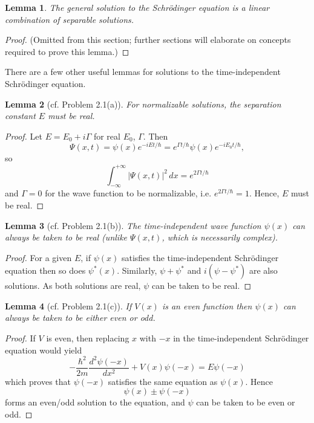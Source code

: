\documentclass{article}
\newtheorem*{lemma*}{Lemma}
\begin{document}
\begin{lemma*}
  The general solution to the Schr\"{o}dinger equation is a \emph{linear
  combination} of separable solutions.
\end{lemma*}
\begin{proof}
  (Omitted from this section; further sections will elaborate on concepts
  required to prove this lemma.)
\end{proof}

There are a few other useful lemmas for solutions to the time-independent
Schr\"{o}dinger equation.

\begin{lemma*}[cf. Problem 2.1(a)]
  For normalizable solutions, the separation constant $E$ must be real.
\end{lemma*}
\begin{proof}
  Let $E = E_0 + i\Gamma$ for real $E_0$, $\Gamma$. Then \[
    \Psi(x, t)
    = \psi(x)e^{-iEt/\hbar}
    = e^{\Gamma t/\hbar} \psi(x) e^{-iE_0t/\hbar},
  \] so \[
    \int_{-\infty}^{+\infty} |\Psi(x, t)|^2 \,dx = e^{2\Gamma t/\hbar}
  \] and $\Gamma = 0$ for the wave function to be normalizable, i.e.
  $e^{2\Gamma t/\hbar} = 1$. Hence, $E$ must be real.
\end{proof}

\begin{lemma*}[cf. Problem 2.1(b)]
  The time-independent wave function $\psi(x)$ can always be taken to be real
  (unlike $\Psi(x, t)$, which is necessarily complex).
\end{lemma*}
\begin{proof}
  For a given $E$, if $\psi(x)$ satisfies the time-independent Schr\"{o}dinger
  equation then so does $\psi^*(x)$. Similarly, $\psi + \psi^*$ and
  $i(\psi - \psi^*)$ are also solutions. As both solutions are real, $\psi$ can
  be taken to be real.
\end{proof}

\begin{lemma*}[cf. Problem 2.1(c)]
  If $V(x)$ is an even function then $\psi(x)$ can always be taken to be either
  even or odd.
\end{lemma*}
\begin{proof}
  If $V$ is even, then replacing $x$ with $-x$ in the time-independent
  Schr\"{o}dinger equation would yield \[
    -\frac{\hbar^2}{2m} \frac{d^2\psi(-x)}{dx^2} + V(x)\psi(-x) = E\psi(-x)
  \] which proves that $\psi(-x)$ satisfies the same equation as $\psi(x)$.
  Hence \[ \psi(x) \pm \psi(-x) \] forms an even/odd solution to the equation,
  and $\psi$ can be taken to be even or odd.
\end{proof}
\end{document}
